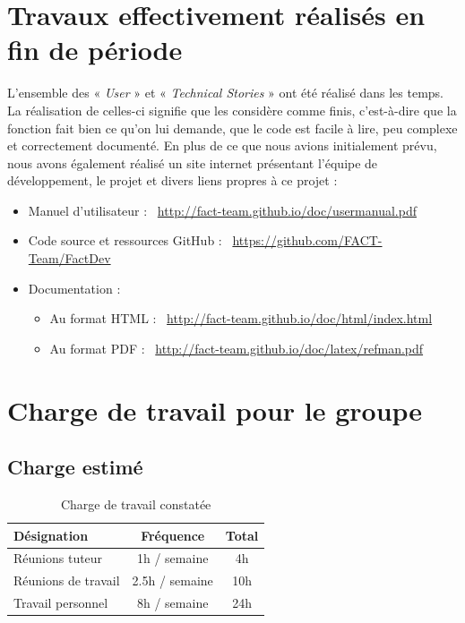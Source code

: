 \documentclass[12pt,a4paper,openany]{article}
\begin{document}
	\section{Travaux effectivement réalisés en fin de période}
	L'ensemble des « \textit{User} » et « \textit{Technical Stories} » ont été réalisé dans les temps. La réalisation de celles-ci signifie que les considère comme
	finis, c'est-à-dire que la fonction fait bien ce qu'on lui demande, que le code est facile à lire, peu complexe et correctement documenté. 
	En plus de ce que nous avions initialement prévu, nous avons également réalisé un site internet présentant l'équipe de développement, le projet et
	divers liens propres à ce projet :
	\begin{itemize}
		\item Manuel d’utilisateur : \Mundus~\url{http://fact-team.github.io/doc/usermanual.pdf}
		\item Code source et ressources GitHub : \Mundus~\url{https://github.com/FACT-Team/FactDev}
		\item Documentation :
			\begin{itemize}
				\item Au format HTML : \Mundus~\url{http://fact-team.github.io/doc/html/index.html}
				\item Au format PDF :  \Mundus~\url{http://fact-team.github.io/doc/latex/refman.pdf}
			\end{itemize}
	\end{itemize}

	\section{Charge de travail pour le groupe}
	\subsection{Charge estimé}
	\begin{table}[H]
		\centering
		\begin{tabular}{l|c|c}
			\textbf{Désignation} & \textbf{Fréquence} & \textbf{Total}\\
			\hline
			Réunions tuteur & 1h / semaine & 4h\\
			Réunions de travail & 2.5h / semaine & 10h\\
			Travail personnel & 8h / semaine & 24h
		\end{tabular}
		\caption{Charge de travail constatée}
	\end{table}
\end{document}
